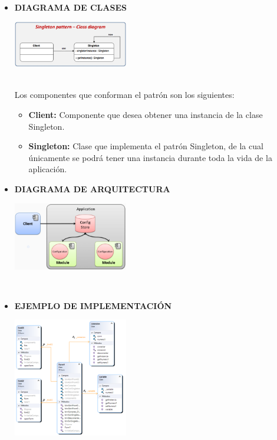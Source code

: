 \documentclass[twoside,twocolumn]{article}
\begin{document}
\begin{itemize}
	\item \textbf{DIAGRAMA DE CLASES}
    \begin{center}
        \includegraphics[width=5cm]{./img/imagen2.png} 
    \end{center}
    \\
    Los componentes que conforman el patrón son los siguientes: 
	\begin{itemize}
		\item \textbf{Client:} Componente que desea obtener una instancia de la clase Singleton. 
		\item \textbf{Singleton:} Clase que implementa el patrón Singleton, de la cual únicamente se podrá tener una instancia durante toda la vida de la aplicación. 
    \end{itemize}
    \item \textbf{DIAGRAMA DE ARQUITECTURA}
    \begin{center}
        \includegraphics[width=5cm]{./img/imagen3.png} 
    \end{center}
    \\
    \item \textbf{EJEMPLO DE IMPLEMENTACIÓN}
    \begin{center}
        \includegraphics[width=5cm]{./img/imagen4.png} 
    \end{center}
	

\end{itemize}
\end{document}
